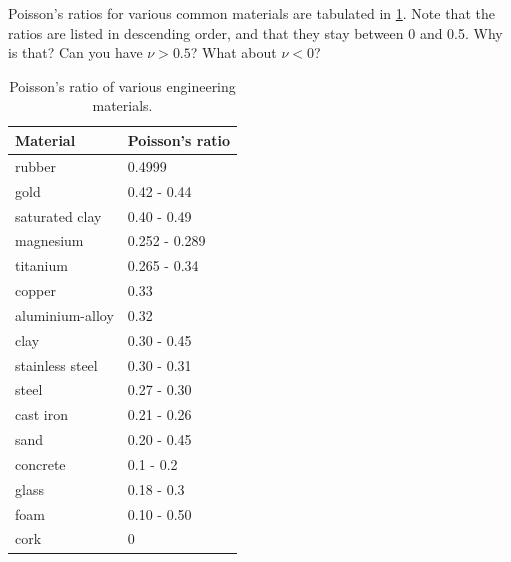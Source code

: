 \documentclass[
fontsize=10pt,
a4paper,
twosides=false,
open=any,
svgnames,
]{kaobook} %
\begin{document}
Poisson's ratios for various common materials are tabulated in \cref{table: poisson's of materials}. Note that the ratios are listed in descending order, and that they stay between 0 and 0.5. Why is that? Can you have $\nu > 0.5$? What about $\nu < 0$?

\begin{table}[htbp]
  \centering
  \caption{Poisson's ratio of various engineering materials.}
  \label{table: poisson's of materials}
  {\renewcommand\arraystretch{1.2}
    \begin{tabular}{ll}
      \toprule
      Material        & Poisson's ratio \\
      \midrule
      rubber          & 0.4999          \\
      gold            & 0.42 - 0.44       \\
      saturated clay  & 0.40 - 0.49       \\
      magnesium       & 0.252 - 0.289     \\
      titanium        & 0.265 - 0.34      \\
      copper          & 0.33            \\
      aluminium-alloy & 0.32            \\
      clay            & 0.30 - 0.45       \\
      stainless steel & 0.30 - 0.31       \\
      steel           & 0.27 - 0.30       \\
      cast iron       & 0.21 - 0.26       \\
      sand            & 0.20 - 0.45       \\
      concrete        & 0.1 - 0.2         \\
      glass           & 0.18 - 0.3        \\
      foam            & 0.10 - 0.50       \\
      cork            & 0               \\
      \bottomrule
    \end{tabular}}
\end{table}
\end{document}
